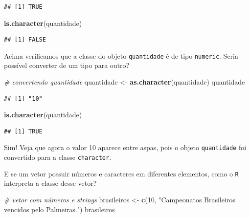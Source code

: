\documentclass[]{book}
\newenvironment{Shaded}{\begin{snugshade}}{\end{snugshade}}
\newcommand{\CommentTok}[1]{\textcolor[rgb]{0.56,0.35,0.01}{\textit{#1}}}
\newcommand{\DecValTok}[1]{\textcolor[rgb]{0.00,0.00,0.81}{#1}}
\newcommand{\KeywordTok}[1]{\textcolor[rgb]{0.13,0.29,0.53}{\textbf{#1}}}
\newcommand{\NormalTok}[1]{#1}
\newcommand{\StringTok}[1]{\textcolor[rgb]{0.31,0.60,0.02}{#1}}
\begin{document}
\begin{verbatim}
## [1] TRUE
\end{verbatim}

\begin{Shaded}
\begin{Highlighting}[]
\KeywordTok{is.character}\NormalTok{(quantidade)}
\end{Highlighting}
\end{Shaded}

\begin{verbatim}
## [1] FALSE
\end{verbatim}

Acima verificamos que a classe do objeto \texttt{quantidade} é de tipo \texttt{numeric}. Seria possível converter de um tipo para outro?

\begin{Shaded}
\begin{Highlighting}[]
\CommentTok{# convertendo quantidade}
\NormalTok{quantidade <-}\StringTok{ }\KeywordTok{as.character}\NormalTok{(quantidade)}
\NormalTok{quantidade}
\end{Highlighting}
\end{Shaded}

\begin{verbatim}
## [1] "10"
\end{verbatim}

\begin{Shaded}
\begin{Highlighting}[]
\KeywordTok{is.character}\NormalTok{(quantidade)}
\end{Highlighting}
\end{Shaded}

\begin{verbatim}
## [1] TRUE
\end{verbatim}

Sim! Veja que agora o valor 10 aparece entre aspas, pois o objeto \texttt{quantidade} foi convertido para a classe \texttt{character}.

E se um vetor possuir números e caracteres em diferentes elementos, como o \texttt{R} interpreta a classe desse vetor?

\begin{Shaded}
\begin{Highlighting}[]
\CommentTok{# vetor com números e strings}
\NormalTok{brasileiros <-}\StringTok{ }\KeywordTok{c}\NormalTok{(}\DecValTok{10}\NormalTok{, }\StringTok{"Campeonatos Brasileiros vencidos pelo Palmeiras."}\NormalTok{)}
\NormalTok{brasileiros}
\end{Highlighting}
\end{Shaded}
\end{document}
